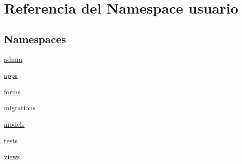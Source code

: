 \hypertarget{namespaceusuario}{}\section{Referencia del Namespace usuario}
\label{namespaceusuario}
\subsection*{Namespaces}
\begin{DoxyCompactItemize}
\item 
 \hyperlink{namespaceusuario_1_1admin}{admin}
\item 
 \hyperlink{namespaceusuario_1_1apps}{apps}
\item 
 \hyperlink{namespaceusuario_1_1forms}{forms}
\item 
 \hyperlink{namespaceusuario_1_1migrations}{migrations}
\item 
 \hyperlink{namespaceusuario_1_1models}{models}
\item 
 \hyperlink{namespaceusuario_1_1tests}{tests}
\item 
 \hyperlink{namespaceusuario_1_1views}{views}
\end{DoxyCompactItemize}
